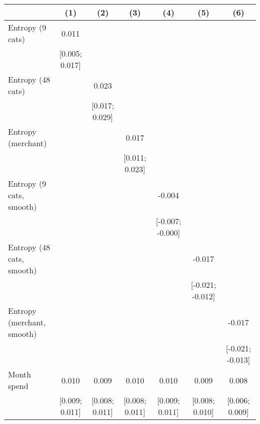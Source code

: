 
\begingroup
\centering
\begin{tabular}{lcccccc}
   \toprule
                              & (1)            & (2)            & (3)            & (4)              & (5)              & (6)\\  
   \midrule 
   Entropy (9 cats)           & 0.011          &                &                &                  &                  &   \\   
                              & [0.005; 0.017] &                &                &                  &                  &   \\   
   Entropy (48 cats)          &                & 0.023          &                &                  &                  &   \\   
                              &                & [0.017; 0.029] &                &                  &                  &   \\   
   Entropy (merchant)         &                &                & 0.017          &                  &                  &   \\   
                              &                &                & [0.011; 0.023] &                  &                  &   \\   
   Entropy (9 cats, smooth)   &                &                &                & -0.004           &                  &   \\   
                              &                &                &                & [-0.007; -0.000] &                  &   \\   
   Entropy (48 cats, smooth)  &                &                &                &                  & -0.017           &   \\   
                              &                &                &                &                  & [-0.021; -0.012] &   \\   
   Entropy (merchant, smooth) &                &                &                &                  &                  & -0.017\\   
                              &                &                &                &                  &                  & [-0.021; -0.013]\\   
   Month spend                & 0.010          & 0.009          & 0.010          & 0.010            & 0.009            & 0.008\\   
                              & [0.009; 0.011] & [0.008; 0.011] & [0.008; 0.011] & [0.009; 0.011]   & [0.008; 0.010]   & [0.006; 0.009]\\   

\end{tabular}
